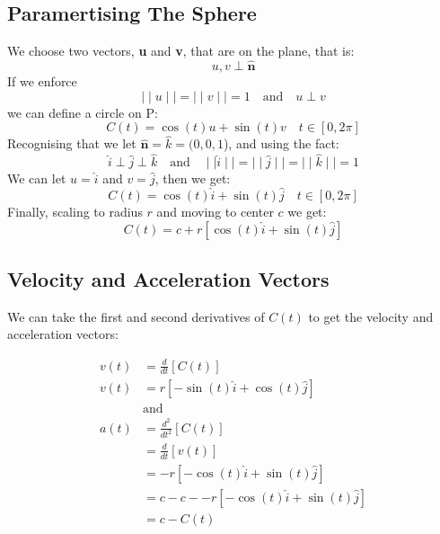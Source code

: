 \documentclass[9pt]{extarticle}
\begin{document}
\subsection{Paramertising The Sphere}
We choose two vectors, \textbf{u} and \textbf{v}, that are on the plane, that is:
$$u, v \perp \hat{\textbf{n}}$$
If we enforce $$\mid \mid u \mid \mid = \mid \mid v \mid \mid = 1 \quad \text{and} \quad u \perp v$$
we can define a circle on P:
$$C(t) = \cos(t) u + \sin(t) v \quad t \in [0, 2\pi]$$
Recognising that we let $\hat{\textbf{n}} = \hat{k} = (0,0,1$), and using the fact:
$$\hat{i} \perp \hat{j} \perp \hat{k} \quad \text{and} \quad \mid \mid \hat{i} \mid \mid = \mid \mid \hat{j} \mid \mid = \mid \mid \hat{k} \mid \mid = 1$$
We can let $u = \hat{i}$ and $v = \hat{j}$, then we get:
$$C(t) = \cos(t) \hat{i} + \sin(t) \hat{j}\quad t \in [0, 2\pi]$$
Finally, scaling to radius $r$ and moving to center $c$ we get:
$$C(t) = c + r \left[\cos(t) \hat{i} + \sin(t) \hat{j}\right]$$
\subsection{Velocity and Acceleration Vectors}
We can take the first and second derivatives of $C(t)$ to get the velocity and acceleration vectors:

\begin{align*}
    v(t) & = \frac{d}{dt} \left[C(t)\right]                             \\
    v(t) & = r\left[-\sin(t) \hat{i} + \cos(t) \hat{j} \right]          \\[1ex]
         & \text{and}                                                   \\[1ex]
    a(t) & = \frac{d^2}{dt^2} \left[C(t)\right]                         \\
         & = \frac{d}{dt}\left[v(t) \right]                             \\
         & = -r\left[-\cos(t) \hat{i} + \sin(t) \hat{j} \right]         \\
         & = c - c - -r\left[-\cos(t) \hat{i} + \sin(t) \hat{j} \right] \\
         & = c - C(t)
\end{align*}
\end{document}
